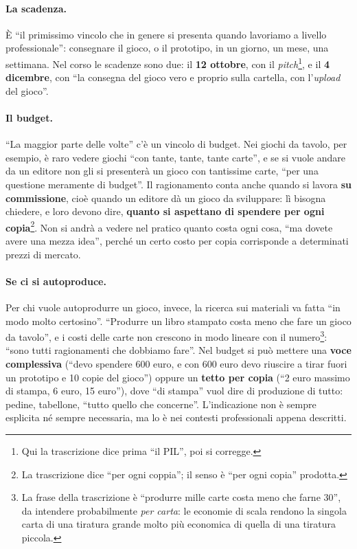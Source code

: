 \paragraph{La scadenza.} È ``il primissimo vincolo che in genere si presenta quando
lavoriamo a livello professionale'': consegnare il gioco, o il prototipo, in un giorno,
un mese, una settimana. Nel corso le scadenze sono due: il \textbf{12 ottobre}, con il
\emph{pitch}\footnote{Qui la trascrizione dice prima ``il PIL'', poi si corregge.}, e
il \textbf{4 dicembre}, con ``la consegna del gioco vero e proprio sulla cartella, con
l'\emph{upload} del gioco''.

\paragraph{Il budget.} ``La maggior parte delle volte'' c'è un vincolo di budget. Nei
giochi da tavolo, per esempio, è raro vedere giochi ``con tante, tante, tante carte'',
e se si vuole andare da un editore non gli si presenterà un gioco con tantissime carte,
``per una questione meramente di budget''. Il ragionamento conta anche quando si
lavora \textbf{su commissione}, cioè quando un editore dà un gioco da sviluppare: lì
bisogna chiedere, e loro devono dire, \textbf{quanto si aspettano di spendere per ogni
copia}\footnote{La trascrizione dice ``per ogni coppia''; il senso è ``per ogni
copia'' prodotta.}. Non si andrà a vedere nel pratico quanto costa ogni cosa, ``ma
dovete avere una mezza idea'', perché un certo costo per copia corrisponde a
determinati prezzi di mercato.

\paragraph{Se ci si autoproduce.} Per chi vuole autoprodurre un gioco, invece, la
ricerca sui materiali va fatta ``in modo molto certosino''. ``Produrre un libro
stampato costa meno che fare un gioco da tavolo'', e i costi delle carte non crescono
in modo lineare con il numero\footnote{La frase della trascrizione è ``produrre mille
carte costa meno che farne 30'', da intendere probabilmente \emph{per carta}: le
economie di scala rendono la singola carta di una tiratura grande molto più economica
di quella di una tiratura piccola.}: ``sono tutti ragionamenti che dobbiamo fare''.
Nel budget si può mettere una \textbf{voce complessiva} (``devo spendere 600 euro, e
con 600 euro devo riuscire a tirar fuori un prototipo e 10 copie del gioco'') oppure
un \textbf{tetto per copia} (``2 euro massimo di stampa, 6 euro, 15 euro''), dove
``di stampa'' vuol dire di produzione di tutto: pedine, tabellone, ``tutto quello che
concerne''. L'indicazione non è sempre esplicita né sempre necessaria, ma lo è nei
contesti professionali appena descritti.

